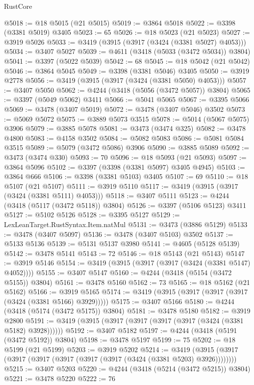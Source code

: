 \begin{lexlean}{RustCore}
\begin{coremodule}
@5018 := @18 @5015 (@21 @5015)
@5019 := @3864 @5018
@5022 := @3398 (@3381 @5019) @3405
@5023 := 65
@5026 := @18 @5023 (@21 @5023)
@5027 := @3919 @5026
@5033 := @3419 (@3915 (@3917 (@3424 (@3381 @5027) @4053)))
@5034 := @3407 @5027
@5039 := @4611 (@3418 (@5033 (@3472 @5034)) @3804)
@5041 := @3397 (@5022 @5039)
@5042 := 68
@5045 := @18 @5042 (@21 @5042)
@5046 := @3864 @5045
@5049 := @3398 (@3381 @5046) @3405
@5050 := @3919 @2778
@5056 := @3419 (@3915 (@3917 (@3424 (@3381 @5050) @4053)))
@5057 := @3407 @5050
@5062 := @4244 (@3418 (@5056 (@3472 @5057)) @3804)
@5065 := @3397 (@5049 @5062) @3411
@5066 := @5041 @5065
@5067 := @3395 @5066
@5069 := @3478 (@3407 @5019)
@5072 := @3478 (@3407 @5046) @3502
@5073 := @5069 @5072
@5075 := @3889 @5073 @3515
@5078 := @5014 (@5067 @5075) @3906
@5079 := @3885 @5078
@5081 := @3473 (@3474 @325)
@5082 := @3478 @4800
@5083 := @4158 @3502
@5084 := @5082 @5083
@5086 := @5081 @5084 @3515
@5089 := @5079 (@3472 @5086) @3906
@5090 := @3885 @5089
@5092 := @3473 (@3474 @330)
@5093 := 70
@5096 := @18 @5093 (@21 @5093)
@5097 := @3864 @5096
@5102 := @3397 (@3398 (@3381 @5097) @3405 @4945)
@5103 := @3864 @666
@5106 := @3398 (@3381 @5103) @3405
@5107 := 69
@5110 := @18 @5107 (@21 @5107)
@5111 := @3919 @5110
@5117 := @3419 (@3915 (@3917 (@3424 (@3381 @5111) @4053)))
@5118 := @3407 @5111
@5123 := @4244 (@3418 (@5117 (@3472 @5118)) @3804)
@5126 := @3397 (@5106 @5123) @3411
@5127 := @5102 @5126
@5128 := @3395 @5127
@5129 := LexLeanTarget.RustSyntax.Item.natMul
@5131 := @3473 (@3886 @5129)
@5133 := @3478 (@3407 @5097)
@5136 := @3478 (@3407 @5103) @3502
@5137 := @5133 @5136
@5139 := @5131 @5137 @3980
@5141 := @4605 (@5128 @5139)
@5142 := @3478 @5141
@5143 := 72
@5146 := @18 @5143 (@21 @5143)
@5147 := @3919 @5146
@5154 := @3419 (@3915 (@3917 (@3917 (@3424 (@3381 @5147) @4052))))
@5155 := @3407 @5147
@5160 := @4244 (@3418 (@5154 (@3472 @5155)) @3804)
@5161 := @3478 @5160
@5162 := 73
@5165 := @18 @5162 (@21 @5162)
@5166 := @3919 @5165
@5174 := @3419 (@3915 (@3917 (@3917 (@3917 (@3424 (@3381 @5166) @3929)))))
@5175 := @3407 @5166
@5180 := @4244 (@3418 (@5174 (@3472 @5175)) @3804)
@5181 := @3478 @5180
@5182 := @3919 @2800
@5191 := @3419 (@3915 (@3917 (@3917 (@3917 (@3917 (@3424 (@3381 @5182) @3928))))))
@5192 := @3407 @5182
@5197 := @4244 (@3418 (@5191 (@3472 @5192)) @3804)
@5198 := @3478 @5197
@5199 := 75
@5202 := @18 @5199 (@21 @5199)
@5203 := @3919 @5202
@5214 := @3419 (@3915 (@3917 (@3917 (@3917 (@3917 (@3917 (@3917 (@3424 (@3381 @5203) @3926))))))))
@5215 := @3407 @5203
@5220 := @4244 (@3418 (@5214 (@3472 @5215)) @3804)
@5221 := @3478 @5220
@5222 := 76

\end{coremodule}
\end{lexlean}
